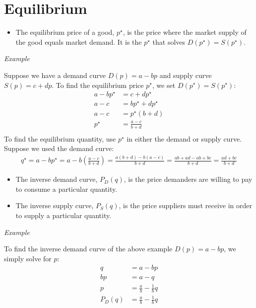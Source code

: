 \documentclass{article}
\begin{document}
\section{Equilibrium}
\begin{itemize}
  \item The equilibrium price of a good, $p^\star$, is the price where the
    market supply of the good equals market demand. It is the $p^\star$ that
    solves $D\left( p^\star \right)=S\left( p^\star \right)$.
\end{itemize}
\emph{Example}\par\noindent
Suppose we have a demand curve $D\left( p \right)=a-bp$ and supply curve $S\left( p \right)=c+dp$. To find the equilibrium price $p^\star$, we set $D\left( p^\star \right)=S\left( p^\star \right)$:
\begin{align*}
  a-bp^\star &= c +dp^\star \\
  a-c&= bp^\star  +dp^\star \\
  a-c&= p^\star \left( b+d \right) \\
  p^\star &= \frac{a-c}{b+d} \\
\end{align*}
To find the equilibrium quantity, use $p^\star$ in either the demand or supply curve. Suppose we used the demand curve:
\begin{align*}
  q^\star = a - bp^\star = a - b\left(\frac{a-c}{b+d}  \right) = \frac{a\left( b+d \right)-b\left( a-c \right)}{b+d} =\frac{ab + ad -ab +bc}{b+d}=\frac{ad+bc}{b+d}
\end{align*}
\begin{itemize}
  \item The inverse demand curve, $P_D\left( q \right)$, is the price
    demanders are willing to pay to consume a particular quantity.
  \item The inverse supply curve, $P_S\left( q \right)$, is the price suppliers
    must receive in order to supply a particular quantity.
\end{itemize}
\emph{Example}\par\noindent
To find the inverse demand curve of the above example $D\left( p \right)=a-bp$, we simply solve for $p$:
\begin{align*}
  q&=a-bp  \\
 bp &=a-q  \\
 p &=\frac{a}{b}-\frac{1}{b}q  \\
 P_D\left( q \right) &=\frac{a}{b}-\frac{1}{b}q  \\
\end{align*}
\end{document}
